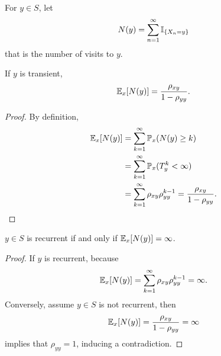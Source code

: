 For $y \in S$, let
\begin{equation*}
    N(y) = \sum_{n=1}^\infty \mathbb{I}_{\left\{X_n = y\right\}}
\end{equation*}
that is the number of visits to $y$.

\begin{lem}
    If $y$ is transient,
    \begin{equation*}
        \mathbb{E}_x[N(y)] = \frac{\rho_{xy}}{1 - \rho_{yy}}.
    \end{equation*}
\end{lem}
\begin{proof}
    By definition,
    \begin{equation*}
        \begin{aligned}
            \mathbb{E}_x[N(y)] & = \sum_{k=1}^\infty \mathbb{P}_x(N(y) \geq k) \\
            &= \sum_{k=1}^\infty \mathbb{P}_x(T_y^k < \infty) \\
            &= \sum_{k=1}^\infty \rho_{xy}\rho_{yy}^{k-1} = \frac{\rho_{xy}}{1 - \rho_{yy}}.
        \end{aligned}\qedhere
    \end{equation*}
\end{proof}

\begin{thm}
    $y \in S$ is recurrent if and only if $\mathbb{E}_x[N(y)] = \infty$.
\end{thm}
\begin{proof}
    If $y$ is recurrent, because
    \begin{equation*}
        \mathbb{E}_x[N(y)] = \sum_{k=1}^\infty \rho_{xy}\rho_{yy}^{k-1} = \infty.
    \end{equation*}
    Conversely, assume $y \in S$ is not recurrent, then
    \begin{equation*}
        \mathbb{E}_x[N(y)] = \frac{\rho_{xy}}{1 - \rho_{yy}} = \infty
    \end{equation*}
    implies that $\rho_{yy} = 1$, inducing a contradiction. \qedhere
\end{proof}

